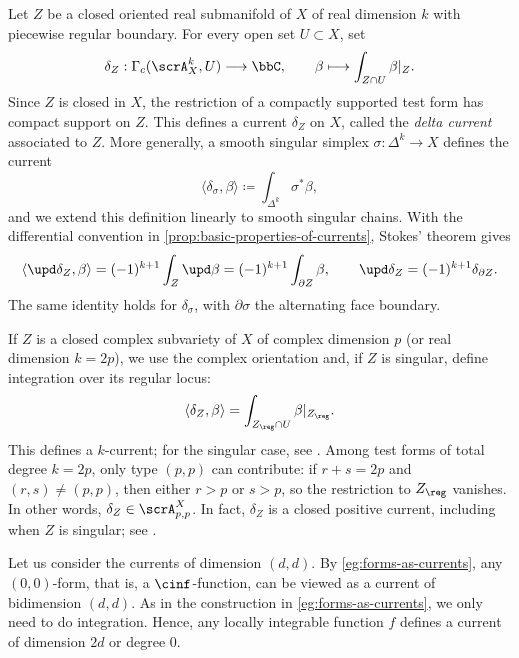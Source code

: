 \begin{example}[label=\labelNFM{eg:submainfolds-as-currents}, status=draft, tag=0000000, title={Cycles as currents}]
	Let $Z$ be a closed oriented real submanifold of $X$ of real dimension $k$ with piecewise regular boundary.
	For every open set $U \subset X$, set
	\[
		\delta_Z:\Gamma_c(\scrA_X^k,U) \longrightarrow \bbC,
		\qquad \beta\longmapsto\int_{Z \cap U}\beta|_Z.
	\]
	Since $Z$ is closed in $X$, the restriction of a compactly supported test form has compact support on $Z$.
	This defines a current $\delta_Z$ on $X$, called the \emph{delta current} associated to $Z$.
	More generally, a smooth singular simplex $\sigma : \Delta^k \to X$ defines the current
	\[ \langle \delta_\sigma,\beta \rangle \coloneqq \int_{\Delta^k} \sigma^*\beta, \]
	and we extend this definition linearly to smooth singular chains.
	With the differential convention in \cref{prop:basic-properties-of-currents}, Stokes' theorem gives
	\[ \langle \upd\delta_Z,\beta \rangle = (-1)^{k+1}\int_Z \upd\beta = (-1)^{k+1}\int_{\partial Z}\beta,\qquad \upd\delta_Z = (-1)^{k+1}\delta_{\partial Z}. \]
	The same identity holds for $\delta_\sigma$, with $\partial\sigma$ the alternating face boundary.

	If $Z$ is a closed complex subvariety of $X$ of complex dimension $p$ (or real dimension $k = 2p$),
	we use the complex orientation and, if $Z$ is singular, define integration over its regular locus:
	\[
		\langle\delta_Z,\beta\rangle
 = \int_{Z_{\reg} \cap U}\beta|_{Z_{\reg}}.
	\]
	This defines a $k$-current; for the singular case, see \cite[Theorem 3.2.26]{Barlet-Magnusson-2019-ComplexAnalyticCycles}.
	Among test forms of total degree $k = 2p$, only type $(p,p)$ can contribute: if $r+s = 2p$ and $(r,s) \neq (p,p)$, then either $r>p$ or $s>p$, so the restriction to $Z_{\reg}$ vanishes.
	In other words, $\delta_Z \in \scrA_{p,p}^X$.
	In fact, $\delta_Z$ is a closed positive current, including when $Z$ is singular; see \cite[Chapter~III, Theorem~2.7]{Demailly-2012-ComplexAnalyticDifferential}.
\end{example}

\begin{example}[label=\labelNFM{eg:currents-of-dimension-2d}, status=draft, tag=0000000, title={Functions as currents of degree zero}]
	Let us consider the currents of dimension $(d,d)$.
	By \cref{eg:forms-as-currents}, any $(0,0)$-form, that is, a $\cinf$-function, can be viewed as a current of bidimension $(d,d)$.
	As in the construction in \cref{eg:forms-as-currents}, we only need to do integration.
	Hence, any locally integrable function $f$ defines a current of dimension $2d$ or degree $0$.
\end{example}

